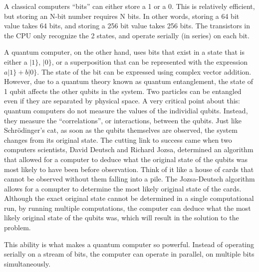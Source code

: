 \documentclass[10pt,journal,compsoc]{IEEEtran}
\begin{document}

A classical computers ``bits'' can either store a 1 or a 0. This is relatively efficient, but storing an N-bit number requires N bits. In other words, storing a 64 bit value takes 64 bits, and storing a 256 bit value takes 256 bits. The transistors in the CPU only recognize the 2 states, and operate serially (in series) on each bit. 

A quantum computer, on the other hand, uses bits that exist in a state that is either a $|1\}$, $|0\}$, or a superposition that can be represented with the expression $a|1\} + b|0\}$. The state of the bit can be expressed using complex vector addition. However, due to a quantum theory known as quantum entanglement, the state of 1 qubit affects the other qubits in the system. Two particles can be entangled even if they are separated by physical space. A very critical point about this: quantum computers do not measure the values of the individial qubits. Instead, they measure the ``correlations'', or interactions, between the qubits. Just like Schr\"{o}dinger's cat, as soon as the qubits themselves are observed, the system changes from its original state. The cutting link to success came when two computers scientists, David Deutsch and Richard Jozsa, determined an algorithm that allowed for a computer to deduce what the original state of the qubits was most likely to have been before observation. Think of it like a house of cards that cannot be observed without them falling into a pile. The Jozsa-Deutsch algorithm allows for a comupter to determine the most likely original state of the cards. Although the exact original state cannot be determined in a single computational run, by running multiple computations, the computer can deduce what the most likely original state of the qubits was, which will result in the solution to the problem\cite{NIST}.


This ability is what makes a quantum computer so powerful. Instead of operating serially on a stream of bits, the computer can operate in parallel, on multiple bits simultaneously. 
\end{document}
